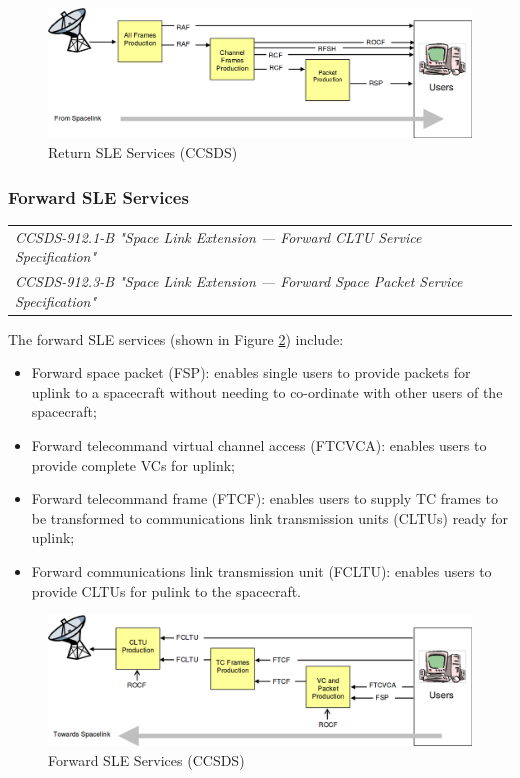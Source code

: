 \begin{figure}[h]
\centering\includegraphics[scale=0.3]{fig/return_sle_services}
\caption{Return SLE Services (CCSDS)}
\label{fig:Return SLE Services}
\end{figure}

\subsubsection{Forward SLE Services}

\begin{tabular}{l}
\textit{CCSDS-912.1-B "Space Link Extension — Forward CLTU Service Specification" \cite{CCSDS-912.1-B}} \\
\textit{CCSDS-912.3-B "Space Link Extension — Forward Space Packet Service Specification" \cite{CCSDS-912.3-B}} \\
\end{tabular}

The forward SLE services (shown in Figure \ref{fig:Forward SLE Services}) include: 

\begin{itemize}
\item Forward space packet (FSP): enables single users to provide packets for uplink to a spacecraft without needing to co-ordinate with other users of the spacecraft;
\item Forward telecommand virtual channel access (FTCVCA): enables users to provide complete VCs for uplink;
\item Forward telecommand frame (FTCF): enables users to supply TC frames to be transformed to communications link transmission units (CLTUs) ready for uplink;
\item Forward communications link transmission unit (FCLTU): enables users to provide CLTUs for pulink to the spacecraft.
\end{itemize}

\begin{figure}[h]
\centering\includegraphics[scale=0.4]{fig/forward_sle_services}
\caption{Forward SLE Services (CCSDS)}
\label{fig:Forward SLE Services}
\end{figure}

